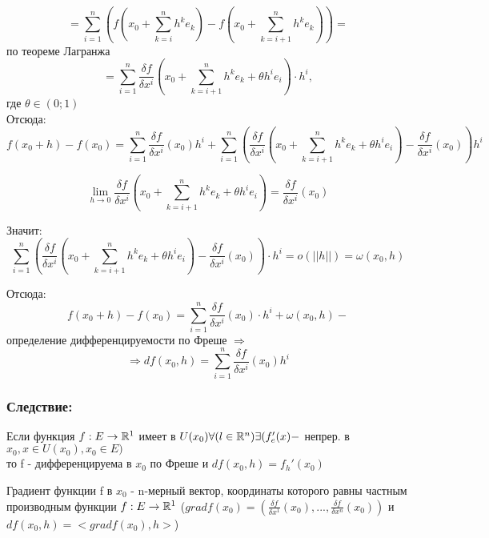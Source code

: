 $$
=\sum_{i=1}^{n}(f(x_0+\sum_{k=i}^{n}h^k e_k)-f(x_0+\sum_{k=i+1}^{n}h^k e_k)) = 
$$
по теореме Лагранжа
$$
=\sum_{i=1}^{n}\frac{\delta f}{\delta x^i}(x_0+\sum_{k=i+1}^{n}h^k e_k + \theta h^i e_i)\cdot h^i,
$$
где $\theta\in(0;1)$
\\
Отсюда:
$$
f(x_0+h)-f(x_0) = \sum_{i=1}^{n}\frac{\delta f}{\delta x^i}(x_0)h^i + \sum_{i=1}^{n}(\frac{\delta f}{\delta x^i}(x_0+\sum_{k=i+1}^{n}h^k e_k +\theta h^i e_i)- \frac{\delta f}{\delta x^i}(x_0))h^i
$$

$$
\lim_{h\to 0}\frac{\delta f}{\delta x^i}(x_0+\sum_{k=i+1}^{n}h^k e_k + \theta h^i e_i) = \frac{\delta f}{\delta x^i} (x_0)
$$

Значит:
$$
\sum_{i=1}^{n}(\frac{\delta f}{\delta x^i}(x_0+\sum_{k=i+1}^{n}h^k e_k + \theta h^i e_i) - \frac{\delta f}{\delta x^i}(x_0))\cdot h^i = o(||h||) = \omega(x_0,h)
$$

Отсюда:
$$
f(x_0+h)-f(x_0) = \sum_{i=1}^{n}\frac{\delta f}{\delta x^i}(x_0)\cdot h^i+\omega(x_0,h) - 
$$
определение дифференцируемости по Фреше $\Rightarrow$
\\
$$
\Rightarrow df(x_0,h) = \sum_{i=1}^{n}\frac{\delta f}{\delta x^i}(x_0)h^i
$$
\dokno
\subsubsection{Следствие:}
Если функция $f:E\to\mathbb{R}^1$ имеет в $U(x_0) \\
\forall(l\in\mathbb{R}^n)\exists(f_e'(x) -$ непрер. в $x_0, x\in U(x_0), x_0\in E)$
\\
то f - дифференцируема в $x_0$ по Фреше и $df(x_0,h)=f_h'(x_0)$

\begin{opred}
Градиент функции f в $x_0$ - n-мерный вектор, координаты которого равны частным производным функции $f:E\to\mathbb{R}^1$
($grad f(x_0) = (\frac{\delta f}{\delta x^1}(x_0),...,\frac{\delta f}{\delta x^n}(x_0))$ и $df(x_0,h)=<grad f(x_0),h>$)
\end{opred}








